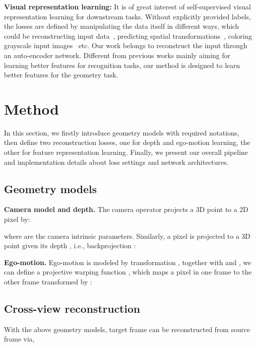 \documentclass[runningheads]{llncs}
\begin{document}
\noindent
\textbf{Visual representation learning:} 
It is of great interest of self-supervised visual representation learning for downstream tasks. Without explicitly provided labels, the losses are defined by manipulating the data itself in different ways, which could be reconstructing input data~\cite{stacked,denoise,afl,avb}, predicting spatial transformations~\cite{sp1,sp2,sp3,sp4}, coloring grayscale input images~\cite{colorization1,colorization2,colorization3,colorization4} etc. Our work belongs to reconstruct the input through an auto-encoder network. Different from previous works mainly aiming for learning better features for recognition tasks, our method is designed to learn better features for the geometry task.























%
 \section{Method}
\label{method}
In this section, we firstly introduce geometry models with required notations, then define two reconstruction losses, one for depth and ego-motion learning, the other for feature representation learning.
Finally, we present our overall pipeline and implementation details about loss settings and network architectures.

\subsection{Geometry models}\label{sec41}
\textbf{Camera model and depth.}
The camera operator  projects a 3D point  to a 2D pixel  by:

where  are the camera intrinsic parameters. Similarly, a pixel  is projected to a 3D point  given its depth , i.e., backprojection :


\textbf{Ego-motion.} Ego-motion is modeled by transformation , together with  and , we can define a projective warping function , which maps a pixel  in one frame to the other frame transformed by :


\subsection{Cross-view reconstruction}
With the above geometry models, target frame  can be reconstructed from source frame  via,
\end{document}
